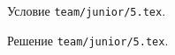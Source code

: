 \problem
Условие \texttt{team/junior/5.tex}.

\solution Решение \texttt{team/junior/5.tex}.
\endproblem
